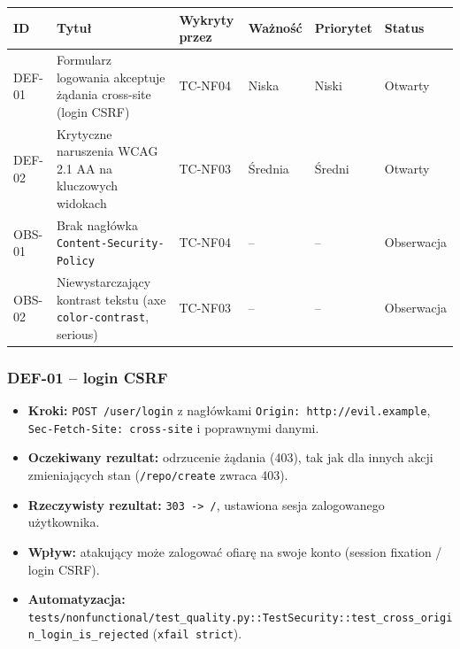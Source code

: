 {\small
\par\smallskip\noindent\begin{tabular}{>{\raggedright\arraybackslash}p{}>{\raggedright\arraybackslash}p{}>{\raggedright\arraybackslash}p{}>{\raggedright\arraybackslash}p{}>{\raggedright\arraybackslash}p{}>{\raggedright\arraybackslash}p{}}
\toprule
\textbf{ID} & \textbf{Tytuł} & \textbf{Wykryty przez} & \textbf{Ważność} & \textbf{Priorytet} & \textbf{Status} \\
\midrule
DEF-01 & Formularz logowania akceptuje żądania cross-site (login CSRF) & TC-NF04 & Niska & Niski & Otwarty \\
DEF-02 & Krytyczne naruszenia WCAG 2.1 AA na kluczowych widokach & TC-NF03 & Średnia & Średni & Otwarty \\
OBS-01 & Brak nagłówka \texttt{Content-Security-Policy} & TC-NF04 & – & – & Obserwacja \\
OBS-02 & Niewystarczający kontrast tekstu (axe \texttt{color-contrast}, serious) & TC-NF03 & – & – & Obserwacja \\
\bottomrule
\end{tabular}\par\smallskip
}
\subsubsection{DEF-01 – login CSRF}
\begin{itemize}
\item \textbf{Kroki:} \texttt{POST /\allowbreak{}user/\allowbreak{}login} z nagłówkami \texttt{Origin: http:/\allowbreak{}/\allowbreak{}evil.example}, \texttt{Sec-Fetch-Site: cross-site} i poprawnymi danymi.
\item \textbf{Oczekiwany rezultat:} odrzucenie żądania (403), tak jak dla innych akcji zmieniających stan (\texttt{/\allowbreak{}repo/\allowbreak{}create} zwraca 403).
\item \textbf{Rzeczywisty rezultat:} \texttt{303 -> /\allowbreak{}}, ustawiona sesja zalogowanego użytkownika.
\item \textbf{Wpływ:} atakujący może zalogować ofiarę na swoje konto (session fixation / login CSRF).
\item \textbf{Automatyzacja:} \texttt{tests/\allowbreak{}nonfunctional/\allowbreak{}test\_\allowbreak{}quality.py::\allowbreak{}TestSecurity::\allowbreak{}test\_\allowbreak{}cross\_\allowbreak{}origin\_\allowbreak{}login\_\allowbreak{}is\_\allowbreak{}rejected} (\texttt{xfail strict}).
\end{itemize}

